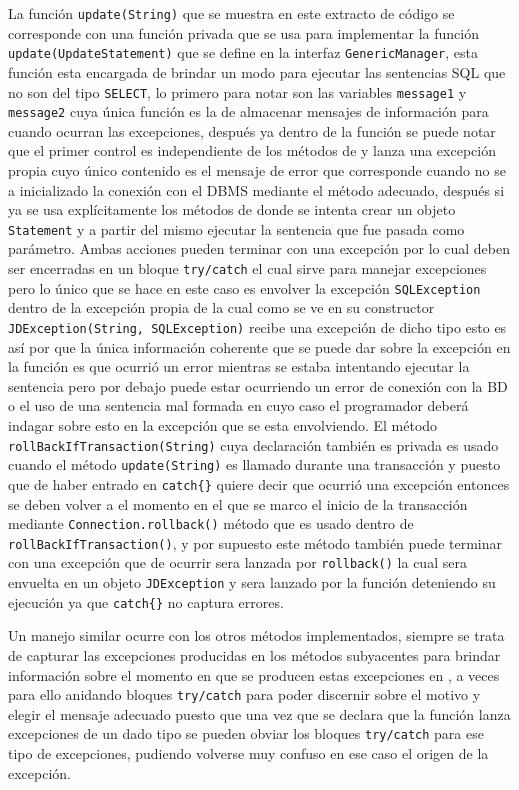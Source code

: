 La función \verb=update(String)= que se muestra en este extracto de código se corresponde con una función privada que se usa para implementar la función \verb=update(UpdateStatement)= que se define en la interfaz \verb=GenericManager=, esta función esta encargada de brindar un modo para ejecutar las sentencias SQL que no son del tipo \verb=SELECT=, lo primero para notar son las variables \verb=message1= y \verb=message2= cuya única función es la de almacenar mensajes de información para cuando ocurran las excepciones, después ya dentro de la función se puede notar que el primer control es independiente de los métodos de \jd y lanza una excepción propia  cuyo único contenido es el mensaje de error que corresponde cuando no se a inicializado la conexión con el DBMS mediante el método adecuado, después si ya se usa explícitamente los métodos de \jd donde se intenta crear un objeto \verb=Statement= y a partir del mismo ejecutar la sentencia que fue pasada como parámetro. Ambas acciones pueden terminar con una excepción por lo cual deben ser encerradas en un bloque \verb=try/catch= el cual sirve para manejar excepciones pero lo único que se hace en este caso es envolver la excepción \verb=SQLException= dentro de la excepción propia de \jd la cual como se ve en su constructor \verb=JDException(String, SQLException)= recibe una excepción de dicho tipo esto es así por que la única información coherente que se puede dar sobre la excepción en la función es que ocurrió un error mientras se estaba intentando ejecutar la sentencia pero por debajo puede estar ocurriendo un error de conexión con la BD o el uso de una sentencia mal formada en cuyo caso el programador deberá indagar sobre esto en la excepción que se esta envolviendo. El método \verb=rollBackIfTransaction(String)= cuya declaración también es privada es usado cuando el método \verb=update(String)= es llamado durante una transacción y puesto que de haber entrado en \verb=catch{}= quiere decir que ocurrió una excepción entonces se deben volver a el momento en el que se marco el inicio de la transacción mediante \verb=Connection.rollback()= método que es usado dentro de \verb=rollBackIfTransaction()=, y por supuesto este método también puede terminar con una excepción que de ocurrir sera lanzada por \verb=rollback()= la cual sera envuelta en un objeto \verb=JDException= y sera lanzado por la función  deteniendo su ejecución ya que \verb=catch{}= no captura errores.

Un manejo similar ocurre con los otros métodos implementados, siempre se trata de capturar las excepciones producidas en los métodos subyacentes para brindar información sobre el momento en que se producen estas excepciones en \jj, a veces para ello anidando bloques \verb=try/catch= para poder discernir sobre el motivo y elegir el mensaje adecuado puesto que una vez que se declara que la función lanza excepciones de un dado tipo se pueden obviar los bloques \verb=try/catch= para ese tipo de excepciones, pudiendo volverse muy confuso en ese caso el origen de la excepción.
%
